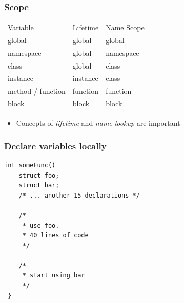 \documentclass[table]{beamer}
\newcounter{rulecount}
\newcommand{\declarerule}{\textbf{\color{themeblue}{Rule \therulecount:}} }
\newcommand{\declarelesson}{\textbf{\color{themeyellow}{Lesson:}} }
\begin{document}
\begin{frame}
    \frametitle{\declarelesson Scope}

    \begin{table}[tl]
        \begin{tabular}{p{3cm}p{2.5cm}p{2.5cm}}
            \rowcolor{codebg}
            \color{white} Variable & \color{white} Lifetime & \color{white} Name Scope\\
                          global & global & global \\
                       namespace & global & namespace \\
                        class & global & class \\
                     instance & instance & class \\
                     method / function & function & function \\
                     block & block & block \\
        \end{tabular}
    \end{table}
    \begin{itemize}
        \item Concepts of \emph{lifetime} and \emph{name lookup} are important
    \end{itemize}
\end{frame}

\begin{frame}[fragile]
    \frametitle{\declarerule Declare variables locally}
    \begin{lstlisting}[title=In ANSI C variables must be declared at the beginning of scope]
int someFunc() 
    struct foo;
    struct bar;
    /* ... another 15 declarations */

    /* 
     * use foo.
     * 40 lines of code
     */

    /* 
     * start using bar
     */
 }
    \end{lstlisting}
\end{frame}
\end{document}
